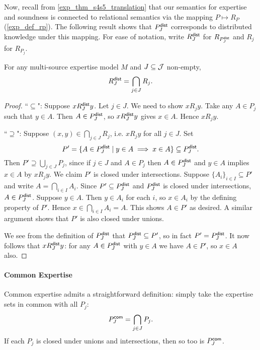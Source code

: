 Now, recall from \cref{exp_thm_s4s5_translation} that our semantics for
expertise and soundness is connected to relational semantics via the mapping
$P \mapsto R_P$ (\cref{exp_def_rp}). The following result shows that
$P^{\mathsf{dist}}_J$ corresponds to distributed knowledge under this mapping. For
ease of notation, write $R^{\mathsf{dist}}_J$ for $R_{P^{\mathsf{dist}}_J}$ and
$R_j$ for $R_{P_j}$.

\begin{proposition}
\label{exp_prop_rpdist}
For any multi-source expertise model $M$ and $J \subseteq \mathcal{J}$ non-empty,
\[
R^{\mathsf{dist}}_J = \bigcap_{j \in J}{R_j}.\]
\end{proposition}

\begin{proof}
    ``$\subseteq$": Suppose $x{R^{\mathsf{dist}}_J}y$. Let $j \in J$.  We need to show
    $x{R_j}y$. Take any $A \in P_j$ such that $y \in A$. Then $A \in P^{\mathsf{dist}}_J$,
    so $x{R^{\mathsf{dist}}_J}y$ gives $x \in A$. Hence $x{R_j}y$.

    ``$\supseteq$": Suppose $(x, y) \in \bigcap_{j \in J}{R_j}$, i.e. $x{R_j}y$
    for all $j \in J$. Set
    \[
        P' = \{A \in P^{\mathsf{dist}}_J \mid y \in A \implies x \in A\}
        \subseteq P^{\mathsf{dist}}_J.
    \]
    Then $P' \supseteq \bigcup_{j \in J}{P_j}$, since if $j \in J$ and $A \in
    P_j$ then $A \in P^{\mathsf{dist}}_J$ and $y \in A$ implies $x \in A$ by $x{R_j}y$.
    We claim $P'$ is closed under intersections. Suppose $\{A_i\}_{i \in I}
    \subseteq P'$ and write $A = \bigcap_{i \in I}{A_i}$. Since $P' \subseteq
    P^{\mathsf{dist}}_J$ and $P^{\mathsf{dist}}_J$ is closed under intersections, $A \in P^{\mathsf{dist}}_J$.
    Suppose $y \in A$.  Then $y \in A_i$ for each $i$, so $x \in A_i$ by the
    defining property of $P'$. Hence $x \in \bigcap_{i \in I}{A_i} = A$. This
    shows $A \in P'$ as desired. A similar argument shows that $P'$ is also
    closed under unions.

    We see from the definition of $P^{\mathsf{dist}}_J$ that $P^{\mathsf{dist}}_J \subseteq P'$, so
    in fact $P' = P^{\mathsf{dist}}_J$. It now follows that $x{R^{\mathsf{dist}}_J}y$: for any $A \in
    P^{\mathsf{dist}}_J$ with $y \in A$ we have $A \in P'$, so $x \in A$ also.
\end{proof}

\paragraph{Common Expertise}

Common expertise admits a straightforward definition: simply take the expertise
sets in common with all $P_j$:
\[
P^{\mathsf{com}}_J = \bigcap_{j \in J}{P_j}.\]
If each $P_j$ is closed under unions and intersections, then so too is
$P^{\mathsf{com}}_J$.

